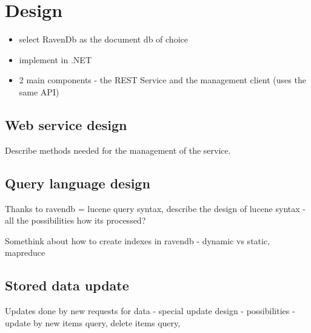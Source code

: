 \chapter{Design}
\label{chap:Design}

\begin{itemize}
	\item select RavenDb as the document db of choice
	\item implement in .NET
	\item 2 main components - the REST Service and the management client (uses the same API)

\end{itemize}

\section{Web service design}
Describe methods needed for the management of the service.

\section{Query language design}
Thanks to ravendb = lucene query syntax, describe the design of lucene syntax - all the possibilities how its processed?

Somethink about how to create indexes in ravendb - dynamic vs static, mapreduce

\section{Stored data update}
Updates done by new requests for data - special update design - possibilities - update by new items query, delete items query, 
